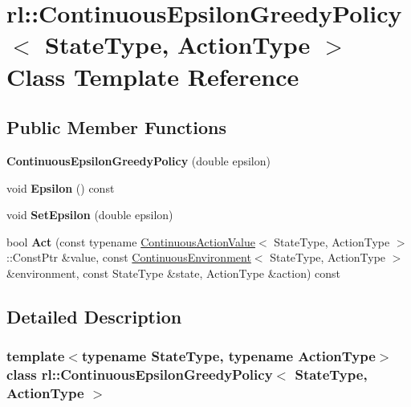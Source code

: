\hypertarget{classrl_1_1_continuous_epsilon_greedy_policy}{}\section{rl\+:\+:Continuous\+Epsilon\+Greedy\+Policy$<$ State\+Type, Action\+Type $>$ Class Template Reference}
\label{classrl_1_1_continuous_epsilon_greedy_policy}
\subsection*{Public Member Functions}
\begin{DoxyCompactItemize}
\item 
\hypertarget{classrl_1_1_continuous_epsilon_greedy_policy_ac37cc6b0760188795ac6beb0b911b2e4}{}\label{classrl_1_1_continuous_epsilon_greedy_policy_ac37cc6b0760188795ac6beb0b911b2e4} 
{\bfseries Continuous\+Epsilon\+Greedy\+Policy} (double epsilon)
\item 
\hypertarget{classrl_1_1_continuous_epsilon_greedy_policy_a53645ef2f35ff6cae4e2472ad9a7295b}{}\label{classrl_1_1_continuous_epsilon_greedy_policy_a53645ef2f35ff6cae4e2472ad9a7295b} 
void {\bfseries Epsilon} () const
\item 
\hypertarget{classrl_1_1_continuous_epsilon_greedy_policy_aea4487f9f6c5dd06b6b081cbb77eb996}{}\label{classrl_1_1_continuous_epsilon_greedy_policy_aea4487f9f6c5dd06b6b081cbb77eb996} 
void {\bfseries Set\+Epsilon} (double epsilon)
\item 
\hypertarget{classrl_1_1_continuous_epsilon_greedy_policy_a6251c0b2ee5220702f52e106b72dcab6}{}\label{classrl_1_1_continuous_epsilon_greedy_policy_a6251c0b2ee5220702f52e106b72dcab6} 
bool {\bfseries Act} (const typename \hyperlink{classrl_1_1_continuous_action_value}{Continuous\+Action\+Value}$<$ State\+Type, Action\+Type $>$\+::Const\+Ptr \&value, const \hyperlink{classrl_1_1_continuous_environment}{Continuous\+Environment}$<$ State\+Type, Action\+Type $>$ \&environment, const State\+Type \&state, Action\+Type \&action) const
\end{DoxyCompactItemize}


\subsection{Detailed Description}
\subsubsection*{template$<$typename State\+Type, typename Action\+Type$>$\newline
class rl\+::\+Continuous\+Epsilon\+Greedy\+Policy$<$ State\+Type, Action\+Type $>$}



